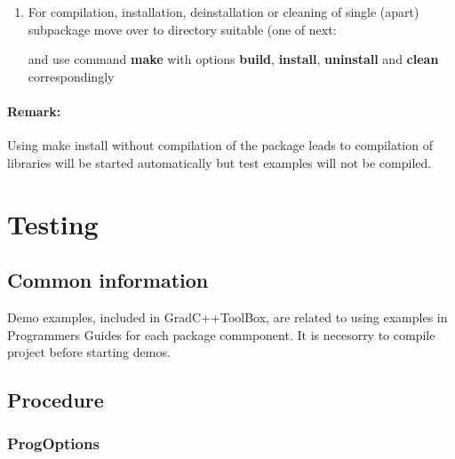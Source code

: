 \documentclass[10pt]{article}
\begin{document}
\begin{enumerate}
 \item For compilation, installation, deinstallation or cleaning of single (apart) subpackage move over
       to directory suitable (one of next:
       and use command {\bf make} with options {\bf build}, {\bf install}, {\bf uninstall} and {\bf clean} correspondingly

 \end{enumerate}

\paragraph{Remark:}
Using {make install} without compilation of the package 
leads to compilation of libraries will be started automatically
but test examples will not be compiled.

\section{ Testing }

\subsection{ Common information }

Demo examples, included in GradC++ToolBox,
are related to using examples in Programmers Guides for each package commponent.
It is necesorry to compile project before starting demos.

\subsection{ Procedure }

\subsubsection{ ProgOptions }
\end{document}
